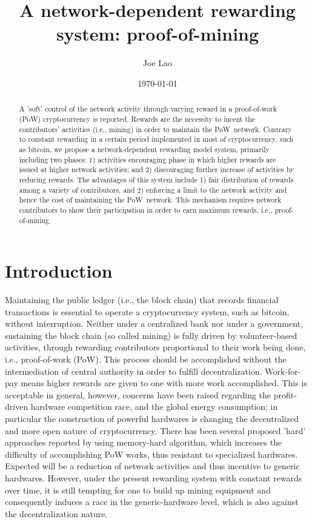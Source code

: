\documentclass[aps,prl,reprint,showpacs,groupedaddress,letterpaper]{revtex4-1}
\newcommand{\pow}{PoW}
\begin{document}
\title{A network-dependent rewarding system: proof-of-mining}

\author{Joe Lao}

\date{\today}

\begin{abstract}
A 'soft' control of the network activity through varying reward in a proof-of-work (PoW) cryptocurrency is reported. Rewards are the necessity to incent the contributors' activities (i.e., mining) in order to maintain the \pow\ network. Contrary to constant rewarding in a certain period implemented in most of cryptocurrency, such as bitcoin, we propose a network-dependent rewarding model system, primarily including two phases: 1) activities encouraging phase in which higher rewards are issued at higher network activities; and 2) discouraging further increase of activities by reducing rewards. The advantages of this system include 1) fair distribution of rewards among a variety of contributors, and 2) enforcing a limit to the network activity and hence the cost of maintaining the \pow\ network. This mechanism requires network contributors to show their participation in order to earn maximum rewards, i.e., proof-of-mining. 
\end{abstract}
\maketitle

\section{Introduction}
Maintaining the public ledger (i.e., the block chain) that records financial transactions is essential to operate a cryptocurrency system, \cite{cryptocurrency.url} such as bitcoin, \cite{Nakamoto2009} without interruption. Neither under a centralized bank nor under a government, sustaining the block chain (so called mining) is fully driven by volunteer-based activities, through rewarding contributors proportional to their work being done, i.e., proof-of-work (PoW). This process should be accomplished without the intermediation of central authority in order to fulfill decentralization. Work-for-pay means higher rewards are given to one with more work accomplished. This is acceptable in general, however, concerns have been raised regarding the profit-driven hardware competition race, and the global energy consumption; \cite{Dagger.url} in particular the construction of powerful hardwares is changing the decentralized and more open nature of cryptocurrency. \cite{bitcoin.threats.url} There has been several proposed 'hard' approaches reported by using memory-hard algorithm, which increases the difficulty of accomplishing PoW works, thus resistant to specialized hardwares. Expected will be a reduction of network activities and thus incentive to generic hardwares. However, under the present rewarding system with constant rewards over time, it is still tempting for one to build up mining equipment and consequently induces a race in the generic-hardware level, which is also against the decentralization nature. 
\end{document}
